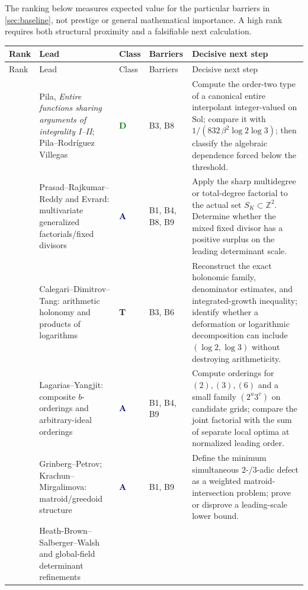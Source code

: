 \documentclass[10pt,letterpaper]{article}
\newcommand{\Z}{\mathbb Z}
\newcommand{\Sol}{\mathrm{Sol}}
\newcommand{\badgeDirect}{\textcolor{green}{\textbf{D}}}
\newcommand{\badgeAdapt}{\textcolor{navy}{\textbf{A}}}
\newcommand{\badgeTemplate}{\textcolor{amber}{\textbf{T}}}
\begin{document}
The ranking below measures expected value for the particular barriers in
\cref{sec:baseline}, not prestige or general mathematical importance.  A high rank requires
both structural proximity and a falsifiable next calculation.

\begingroup
\footnotesize
\setlength{\LTleft}{0pt}
\setlength{\LTright}{0pt}
\setlength{\tabcolsep}{3.5pt}
\begin{longtable}{@{}C{0.04\textwidth}L{0.255\textwidth}C{0.065\textwidth}L{0.12\textwidth}L{0.44\textwidth}@{}}
\toprule
Rank & Lead & Class & Barriers & Decisive next step\\
\midrule
\endfirsthead
\toprule
Rank & Lead & Class & Barriers & Decisive next step\\
\midrule
\endhead
\bottomrule
{} & Pila, \emph{Entire functions sharing arguments of integrality I--II};
Pila--Rodr\'iguez Villegas & \badgeDirect & B3, B8 & Compute the order-two type of a
canonical entire interpolant integer-valued on \(\Sol\); compare it with
\(1/(832\,\beta^2\log2\log3)\); then classify the algebraic dependence forced below the
threshold.\\
 & Prasad--Rajkumar--Reddy and Evrard: multivariate generalized factorials/fixed divisors &
\badgeAdapt & B1, B4, B8, B9 & Apply the sharp multidegree or total-degree factorial to the
actual set \(S_K\subset\Z^2\).  Determine whether the mixed fixed divisor has a positive
surplus on the leading determinant scale.\\
 & Calegari--Dimitrov--Tang: arithmetic holonomy and products of logarithms &
\badgeTemplate & B3, B6 & Reconstruct the exact holonomic family, denominator estimates, and
integrated-growth inequality; identify whether a deformation or logarithmic decomposition can
include \((\log2,\log3)\) without destroying arithmeticity.\\
 & Lagarias--Yangjit: composite \(b\)-orderings and arbitrary-ideal orderings &
\badgeAdapt & B1, B4, B9 & Compute orderings for \((2),(3),(6)\) and a small family
\((2^u3^v)\) on candidate grids; compare the joint factorial with the sum of separate local
optima at normalized leading order.\\
 & Grinberg--Petrov; Krachun--Mirgalimova: matroid/greedoid structure &
\badgeAdapt & B1, B9 & Define the minimum simultaneous \(2\)-/\(3\)-adic defect as a weighted
matroid-intersection problem; prove or disprove a leading-scale lower bound.\\
 & Heath-Brown--Salberger--Walsh and global-field determinant refinements &

\end{longtable}
\end{document}
